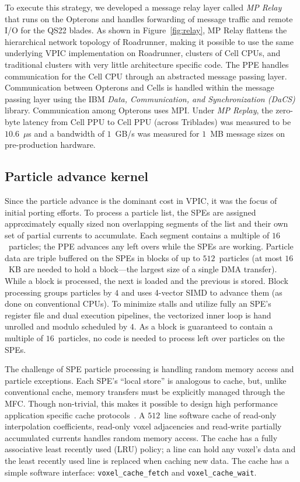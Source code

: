 \documentclass[journal,twoside]{IEEEtran}
\newcommand{\fig}[1]{Figure~\ref{fig:#1}}
\begin{document}
To execute this strategy, we developed a message relay layer called
\emph{MP Relay} that runs on the Opterons and handles forwarding of
message traffic and remote I/O for the QS22 blades.  As shown in
\fig{relay}, MP Relay flattens the hierarchical network topology of
Roadrunner, making it possible to use the same underlying VPIC
implementation on Roadrunner, clusters of Cell CPUs, and traditional
clusters with very little architecture specific code.  The PPE handles
communication for the Cell CPU through an abstracted message passing
layer.  Communication between Opterons and Cells is handled within the
message passing layer using the IBM \emph{Data, Communication, and
Synchronization (DaCS)} library.  Communication among Opterons uses
MPI.  Under \emph{MP Replay}, the zero-byte latency from Cell PPU to
Cell PPU (across Triblades) was measured to be $10.6$~$\mu$s and a
bandwidth of $1$~GB/s was measured for $1$~MB message sizes on
pre-production hardware.

\subsection{Particle advance kernel}

Since the particle advance is the dominant cost in VPIC, it was the
focus of initial porting efforts.  To process a particle list, the SPEs
are assigned approximately equally sized non overlapping segments of
the list and their own set of partial currents to accumulate.  Each
segment contains a multiple of $16$~particles; the PPE advances any
left overs while the SPEs are working.  Particle data are triple
buffered on the SPEs in blocks of up to $512$~particles (at most
$16$~KB are needed to hold a block---the largest size of a single DMA
transfer).  While a block is processed, the next is loaded and the
previous is stored.  Block processing groups particles by $4$ and uses
4-vector SIMD to advance them (as done on conventional CPUs).  To
minimize stalls and utilize fully an SPE's register file and dual
execution pipelines, the vectorized inner loop is hand unrolled and
modulo scheduled by $4$.  As a block is guaranteed to contain a
multiple of $16$~particles, no code is needed to process left over
particles on the SPEs.

The challenge of SPE particle processing is handling random memory
access and particle exceptions.  Each SPE's ``local store'' is
analogous to cache, but, unlike conventional cache, memory transfers
must be explicitly managed through the MFC.  Though non-trivial, this
makes it possible to design high performance application specific
cache protocols~\cite{Kahle_et_al_2005}.  A $512$~line software cache
of read-only interpolation coefficients, read-only voxel adjacencies
and read-write partially accumulated currents handles random memory
access.  The cache has a fully associative least recently used (LRU)
policy; a line can hold any voxel's data and the least recently used
line is replaced when caching new data.  The cache has a simple
software interface: \verb+voxel_cache_fetch+ and
\verb+voxel_cache_wait+.
\end{document}
